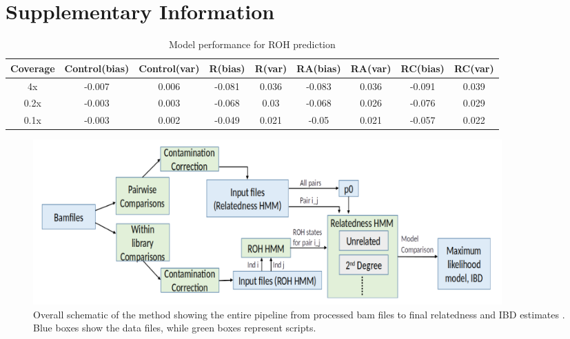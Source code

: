 \documentclass[12pt, letterpaper]{article}
\begin{document}
\section{Supplementary Information}



\begin{table}
\caption{\label{tab:Table 2}Model performance for ROH prediction}
\begin{tabular}{|c|c|c|c|c|c|c|c|c|}
    \hline
    Coverage & Control(bias) & Control(var) & R(bias) & R(var) & RA(bias) & RA(var) & RC(bias) & RC(var)\\
    \hline
    4x & -0.007 & 0.006 & -0.081 & 0.036 & -0.083 & 0.036 & -0.091 & 0.039\\
    \hline
    0.2x & -0.003 & 0.003 & -0.068 & 0.03 & -0.068 & 0.026 & -0.076 & 0.029\\
    \hline
    0.1x & -0.003 & 0.002 & -0.049 & 0.021 & -0.05 & 0.021 & -0.057 & 0.022\\
    \hline
\end{tabular}
\label{table1}
\end{table}

\renewcommand{\figurename}{Fig. S}
\begin{figure}[h!]
    \includegraphics[width=18cm]{plots/inkscape_finalImg/schematic_sup.png}
    \centering
    \caption{Overall schematic of the method showing the entire pipeline from processed bam files to final relatedness and IBD estimates . Blue boxes show the data files, while green boxes represent scripts.}
    \label{figS0:schematic}
\end{figure}
\end{document}
